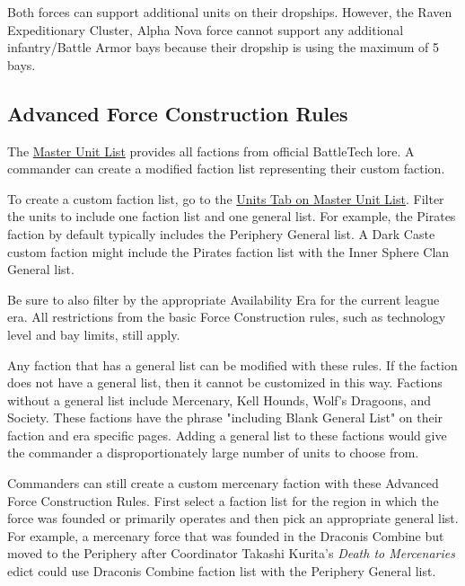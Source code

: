 \documentclass{article}
\begin{document}
Both forces can support additional units on their dropships.
However, the Raven Expeditionary Cluster, Alpha Nova force cannot support any additional infantry/Battle Armor bays because their dropship is using the maximum of 5 bays.

\newpage

\subsection{Advanced Force Construction Rules}

The \href{http://www.masterunitlist.info/}{Master Unit List} provides all factions from official BattleTech lore.
A commander can create a modified faction list representing their custom faction.

To create a custom faction list, go to the \href{http://www.masterunitlist.info/Unit/Filter}{Units Tab on Master Unit List}.
Filter the units to include one faction list and one general list.
For example, the Pirates faction by default typically includes the Periphery General list.
A Dark Caste custom faction might include the Pirates faction list with the Inner Sphere Clan General list.

Be sure to also filter by the appropriate Availability Era for the current league era.
All restrictions from the basic Force Construction rules, such as technology level and bay limits, still apply.

Any faction that has a general list can be modified with these rules.
If the faction does not have a general list, then it cannot be customized in this way.
Factions without a general list include Mercenary, Kell Hounds, Wolf's Dragoons, and Society.
These factions have the phrase "including Blank General List" on their faction and era specific pages.
Adding a general list to these factions would give the commander a disproportionately large number of units to choose from.

Commanders can still create a custom mercenary faction with these Advanced Force Construction Rules.
First select a faction list for the region in which the force was founded or primarily operates and then pick an appropriate general list.
For example, a mercenary force that was founded in the Draconis Combine but moved to the Periphery after Coordinator Takashi Kurita's \emph{Death to Mercenaries} edict could use Draconis Combine faction list with the Periphery General list.
\end{document}
